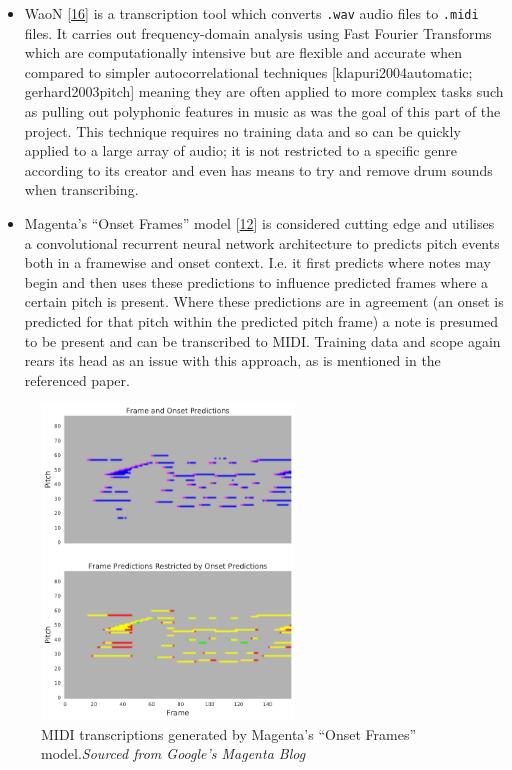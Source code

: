 \documentclass[12pt,]{article}
\providecommand{\tightlist}{%
  \setlength{\itemsep}{0pt}\setlength{\parskip}{0pt}}
\begin{document}
\begin{itemize}
\tightlist
\item
  WaoN {[}\protect\hyperlink{ref-waon}{16}{]} is a transcription tool
  which converts \texttt{.wav} audio files to \texttt{.midi} files. It
  carries out frequency-domain analysis using Fast Fourier Transforms
  which are computationally intensive but are flexible and accurate when
  compared to simpler autocorrelational techniques
  {[}klapuri2004automatic; gerhard2003pitch{]} meaning they are often
  applied to more complex tasks such as pulling out polyphonic features
  in music as was the goal of this part of the project. This technique
  requires no training data and so can be quickly applied to a large
  array of audio; it is not restricted to a specific genre according to
  its creator and even has means to try and remove drum sounds when
  transcribing.
\item
  Magenta's ``Onset Frames'' model
  {[}\protect\hyperlink{ref-hawthorne2017onsets}{12}{]} is considered
  cutting edge and utilises a convolutional recurrent neural network
  architecture to predicts pitch events both in a framewise and onset
  context. I.e. it first predicts where notes may begin and then uses
  these predictions to influence predicted frames where a certain pitch
  is present. Where these predictions are in agreement (an onset is
  predicted for that pitch within the predicted pitch frame) a note is
  presumed to be present and can be transcribed to MIDI. Training data
  and scope again rears its head as an issue with this approach, as is
  mentioned in the referenced paper.
\end{itemize}

\begin{figure}
\centering
\includegraphics[width=0.6\textwidth,height=\textheight]{Images/frames.png}
\caption{MIDI transcriptions generated by Magenta's ``Onset Frames''
model.\newline\textit{Sourced from Google's Magenta Blog}}
\end{figure}
\end{document}
